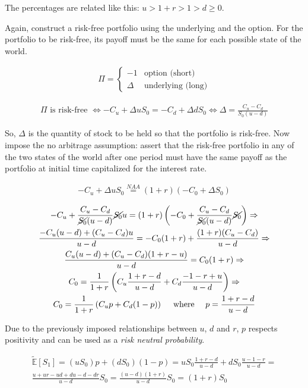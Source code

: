 \documentclass[oneside,titlepage,headinclude,12pt,a4paper,BCOR5mm,footinclude]{book}
\theoremstyle{defn}
\begin{document}
The percentages are related like this: $u > 1 + r > 1 > d \geq 0$.

Again, construct  a risk-free portfolio  using the underlying and  the option.
For  the portfolio  to be  risk-free, its  payoff must  be the  same for  each
possible state of the world.

\begin{align*}
  \Pi = \left\{ \begin{array}{cl}
      -1 & \text{option (short)} \\
      \Delta & \text{underlying (long)}
    \end{array}
\end{align*}

\begin{align*}
  \Pi \text{ is risk-free } \iff -C_u + \Delta uS_0 = -C_d + \Delta dS_0
  \iff \Delta = \frac{C_u-C_d}{S_0(u-d)}
\end{align*}

So, $\Delta$  is the quantity  of stock  to be held  so that the  portfolio is
risk-free. Now impose  the no arbitrage assumption: assert  that the risk-free
portfolio in any of the two states of the world after one period must have the
same payoff  as the  portfolio at  initial time  capitalized for  the interest
rate.

\begin{align*}
  -C_u + \Delta uS_0 \stackrel{NAA}{=} (1 + r)(-C_0 + \Delta S_0)
\end{align*}

\begin{gather*}
  -C_u + \frac{C_u - C_d}{\cancel{S_0}(u-d)}\cancel{S_0}u =
  (1+r)\left(-C_0 + \frac{C_u - C_d}{\cancel{S_0}(u-d)}\cancel{S_0}\right) \Rightarrow
  \\
  \frac{-C_u(u-d) + (C_u - C_d)u}{u-d} = -C_0(1+r) + \frac{(1+r)(C_u-C_d)}{u-d} \Rightarrow
  \\
  \frac{C_u(u-d)+(C_u-C_d)(1+r-u)}{u-d} = C_0(1+r) \Rightarrow
  \\
  C_0 = \frac{1}{1+r} \left( C_u \frac{1+r-d}{u-d} + C_d \frac{-1-r+u}{u-d} \right) \Rightarrow
  \\
  C_0 = \frac{1}{1+r} \left(C_u p + C_d(1-p)\right) \quad \text{ where } \quad p = \frac{1+r-d}{u-d}
\end{gather*}

Due to  the previously  imposed relationships  between $u$,  $d$ and  $r$, $p$
respects positivity and can be used as a \textit{risk neutral probability}.

\begin{gather*}
  \mathbb{\tilde E}[S_1] = (uS_0)p + (dS_0)(1-p) = uS_0 \frac{1+r-d}{u-d} + dS_0 \frac{u-1-r}{u-d} =
  \\ \frac{u + ur - ud + du -d -dr}{u-d}S_0 = \frac{(u-d)(1+r)}{u-d}S_0 = (1+r)S_0
\end{gather*}
\end{document}

